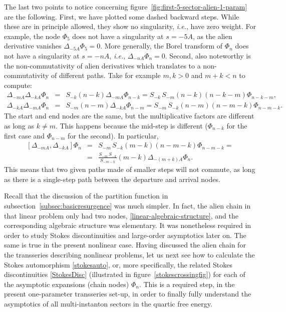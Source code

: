 \documentclass[11pt,a4paper]{article}
\newcommand{\bea}{\begin{eqnarray}}
\newcommand{\eea}{\end{eqnarray}}
\begin{document}
The last two points to notice concerning figure~\ref{fig:first-5-sector-alien-1-param} are the following. First, we have plotted some dashed backward steps. While these are in principle allowed, they show no singularity, \textit{i.e.}, have zero weight. For example, the node $\Phi_5$ does not have a singularity at $s=-5A$, as the alien derivative vanishes $\Delta_{-5A}\Phi_5=0$. More generally, the Borel transform of $\Phi_n$ does not have a singularity at $s=-nA$, \textit{i.e.}, $\Delta_{-nA}\Phi_n=0$. Second, also noteworthy is the non-commutativity of alien derivatives which translates to a non-commutativity of different paths. Take for example $m, k>0$ and $m+k<n$ to compute:
%
\begin{eqnarray}
\Delta_{-mA} \Delta_{-kA} \Phi_n &=& S_{-k} \left(n-k\right) \Delta_{-mA} \Phi_{n-k} = S_{-k}\, S_{-m} \left(n-k\right) \left(n-k-m\right) \Phi_{n-k-m}, \\
\Delta_{-kA} \Delta_{-mA} \Phi_n &=& S_{-m} \left(n-m\right) \Delta_{-kA} \Phi_{n-m} = S_{-m}\, S_{-k} \left(n-m\right) \left(n-m-k\right) \Phi_{n-m-k}.
\end{eqnarray}
%
\noindent
The start and end nodes are the same, but the multiplicative factors are different as long as $k\ne m$. This happens because the mid-step is different ($\Phi_{n-k}$ for the first case and $\Phi_{n-m}$ for the second). In particular,
%
\bea
\left[ \Delta_{-mA}, \Delta_{-kA} \right] \Phi_n &=& S_{-m}\, S_{-k} \left( m-k \right) \left(n-m-k\right) \Phi_{n-m-k} = \nonumber \\
&=& \frac{S_{-m}\, S_{-k}}{S_{-m-k}} \left( m-k \right) \Delta_{-(m+k)A} \Phi_{n}.
\label{virasoro-1d-teaser}
\eea
%
\noindent
This means that two given paths made of smaller steps will not commute, as long as there is a single-step path between the departure and arrival nodes.

Recall that the discussion of the partition function in subsection~\ref{subsec:basicresurgence} was much simpler. In fact, the alien chain in that linear problem only had two nodes, \eqref{linear-algebraic-structure}, and the corresponding algebraic structure was elementary. It was nonetheless required in order to study Stokes discontinuities and large-order asymptotics later on. The same is true in the present nonlinear case. Having discussed the alien chain for the transseries describing nonlinear problems, let us next see how to calculate the Stokes automorphism \eqref{stokesauto}, or, more specifically, the related Stokes discontinuities \eqref{StokesDisc} (illustrated in figure~\ref{stokescrossingfig}) for each of the asymptotic expansions (chain nodes) $\Phi_n$. This is a required step, in the present one-parameter transseries set-up, in order to finally fully understand the asymptotics of all multi-instanton sectors in the quartic free energy.
\end{document}

